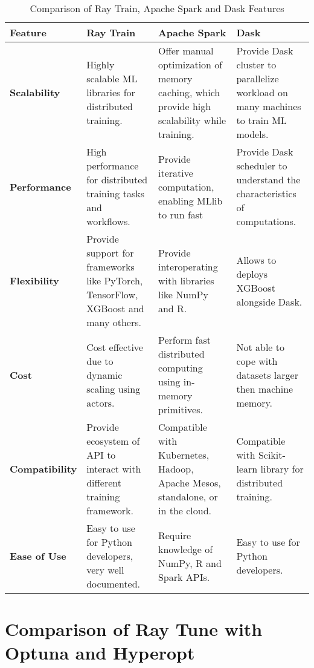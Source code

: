 \begin{table}[ht]
\centering
\begin{tabular}{|p{2.5cm}|p{3.8cm}|p{3.3cm}|p{3.8cm}|}
\hline
\textbf{Feature} & \textbf{Ray Train} & \textbf{Apache Spark} & \textbf{Dask} \\
\hline
\textbf{Scalability} & Highly scalable ML libraries for distributed training. \cite{ray_doc} & Offer manual optimization of memory caching, which provide high scalability while training. \cite{garcia2017comparison}& Provide Dask cluster to parallelize workload on many machines to train ML models. \cite{dask_docs}\\
\hline
\textbf{Performance} & High performance for distributed training tasks and workflows. \cite{ray_doc} & Provide iterative computation, enabling MLlib to run fast \cite{apache_spark} & Provide Dask scheduler to understand the characteristics of computations. \cite{dask_docs}\\
\hline
\textbf{Flexibility} & Provide support for frameworks like PyTorch, TensorFlow, XGBoost and many others. \cite{ray_doc} & Provide interoperating with libraries like NumPy and R. \cite{apache_spark} & Allows to deploys XGBoost alongside Dask. \cite{dask_docs}\\
\hline
\textbf{Cost} & Cost effective due to dynamic scaling using actors. \cite{ray_doc}& Perform fast distributed computing using in-memory primitives. \cite{garcia2017comparison} & Not able to cope with datasets larger then machine memory. \cite{dask_docs} \\
\hline
\textbf{Compatibility} & Provide ecosystem of API to interact with different training framework. \cite{ray_doc} & Compatible with Kubernetes, Hadoop, Apache Mesos, standalone, or in the cloud. \cite{apache_spark}& Compatible with Scikit-learn library for distributed training. \cite{dask_docs}\\
\hline
\textbf{Ease of Use} & Easy to use for Python developers, very well documented. & Require knowledge of NumPy, R and Spark APIs. \cite{apache_spark}& Easy to use for Python developers. \\
\hline

\hline
\end{tabular}
\caption{Comparison of Ray Train, Apache Spark and Dask Features}
\label{tab:table3}
\end{table}


\clearpage

\section{Comparison of Ray Tune with Optuna and Hyperopt}


